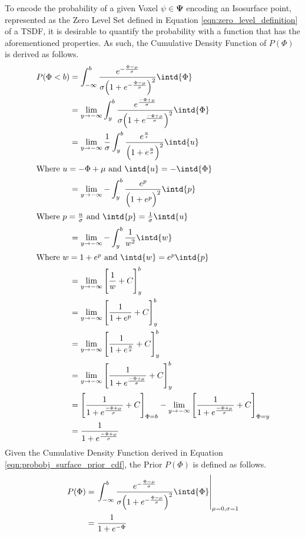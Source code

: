 To encode the probability of a given Voxel $\psi \in \mathbf{\Psi}$ encoding an
Isosurface point, represented as the Zero Level Set defined in Equation
\ref{eqn:zero_level_definition} of a TSDF, it is desirable to quantify the
probability with a function that has the aforementioned properties. As such, the
Cumulative Density Function of $P(\Phi)$ is derived as follows.
\begin{align}
  \label{eqn:probobj_surface_prior_cdf}
  P(\Phi < b) &= \int_{-\infty}^{b} \frac
  {e^{-\frac{\Phi - \mu}{\sigma}}}
  {\sigma \Big( 1 + e^{-\frac{\Phi - \mu}{\sigma}} \Big)^{2}} \intd{\Phi}\\
  &= \lim_{y\to -\infty} \int_{y}^{b} \frac
  {e^{\frac{-\Phi + \mu}{\sigma}}}
  {\sigma \Big( 1 + e^{\frac{-\Phi + \mu}{\sigma}} \Big)^{2}} \intd{\Phi}\\
  &= \lim_{y\to -\infty} \frac{1}{\sigma} \int_{y}^{b}
  \frac{e^{\frac{u}{s}}}{\Big( 1 + e^{\frac{u}{\sigma}} \Big)^{2}} \intd{u}\\
  \shortintertext{Where $u = -\Phi + \mu$ and $\intd{u} = -\intd{\Phi}$}
  &= \lim_{y\to -\infty} -\int_{y}^{b}
  \frac{e^{p}}{\Big( 1 + e^{p} \Big)^{2}} \intd{p}\\
  \shortintertext{Where $p = \frac{u}{\sigma}$ and $\intd{p} = \frac{1}{\sigma}
  \intd{u}$}
  &= \lim_{y\to -\infty} -\int_{y}^{b} \frac{1}{w^{2}} \intd{w}\\
  \shortintertext{Where $w = 1 + e^{p}$ and $\intd{w} = e^{p} \intd{p}$}
  &= \lim_{y\to -\infty} \Bigg[ \frac{1}{w} + C \Bigg]_{y}^{b}\\
  &= \lim_{y\to -\infty} \Bigg[ \frac{1}{1 + e^{p}} + C \Bigg]_{y}^{b}\\
  &= \lim_{y\to -\infty} \Bigg[ \frac{1}{1 +e^{\frac{u}{\sigma}}} + C
  \Bigg]_{y}^{b}\\
  &= \lim_{y\to -\infty} \Bigg[ \frac{1}{1 + e^{\frac{-\Phi + \mu}{\sigma}}} +
  C \Bigg]_{y}^{b}\\
  &= \Bigg[ \frac{1}{1 + e^{\frac{-\Phi + \mu}{\sigma}}} + C \Bigg]_{\Phi = b}
  - \lim_{y\to -\infty}
  \Bigg[ \frac{1}{1 + e^{\frac{-\Phi + \mu}{\sigma}}} + C \Bigg]_{\Phi = y}\\
  &= \frac{1}{1 + e^{\frac{-\Phi + \mu}{\sigma}}}
\end{align}
Given the Cumulative Density Function derived in Equation
\ref{eqn:probobj_surface_prior_cdf}, the Prior $P(\Phi)$ is defined as follows.
\begin{align}
  \label{eqn:probobj_surface_prior}
  P(\Phi) &= \left. \int_{-\infty}^{b} \frac
  {e^{-\frac{\Phi - \mu}{\sigma}}}
  {\sigma \Big( 1 + e^{-\frac{\Phi - \mu}{\sigma}} \Big)^{2}} \intd{\Phi}
  \right\rvert_{\mu = 0, \sigma = 1}\\
  &= \frac{1}{1 + e^{-\Phi}}
\end{align}

